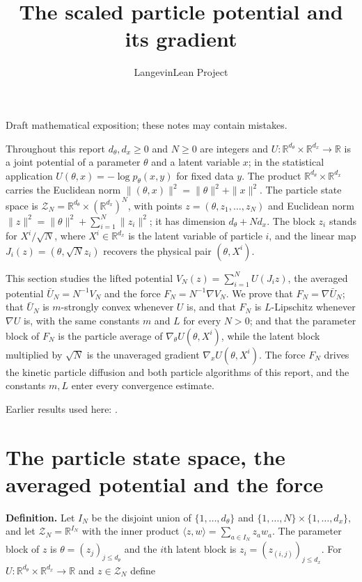 \documentclass[11pt,a4paper]{article}
\title{\texorpdfstring{The scaled particle potential and its gradient}{The scaled particle potential and its gradient}}
\author{LangevinLean Project}
\date{}
\begin{document}
\maketitle
Draft mathematical exposition; these notes may contain mistakes.


Throughout this report \(d_\theta,d_x\ge0\) and \(N\ge0\) are integers and \(U:\mathbb R^{d_\theta}\times\mathbb R^{d_x}\to\mathbb R\) is a joint potential of a parameter \(\theta\) and a latent variable \(x\); in the statistical application \(U(\theta,x)=-\log p_\theta(x,y)\) for fixed data \(y\). The product \(\mathbb R^{d_\theta}\times\mathbb R^{d_x}\) carries the Euclidean norm \(\|(\theta,x)\|^2=\|\theta\|^2+\|x\|^2\). The particle state space is \(\mathcal Z_N=\mathbb R^{d_\theta}\times(\mathbb R^{d_x})^N\), with points \(z=(\theta,z_1,\dots,z_N)\) and Euclidean norm \(\|z\|^2=\|\theta\|^2+\sum_{i=1}^N\|z_i\|^2\); it has dimension \(d_\theta+Nd_x\). The block \(z_i\) stands for \(X^i/\sqrt N\), where \(X^i\in\mathbb R^{d_x}\) is the latent variable of particle \(i\), and the linear map \(J_i(z)=(\theta,\sqrt Nz_i)\) recovers the physical pair \((\theta,X^i)\).




This section studies the lifted potential \(V_N(z)=\sum_{i=1}^NU(J_iz)\), the averaged potential \(\bar U_N=N^{-1}V_N\) and the force \(F_N=N^{-1}\nabla V_N\). We prove that \(F_N=\nabla\bar U_N\); that \(\bar U_N\) is \(m\)-strongly convex whenever \(U\) is, and that \(F_N\) is \(L\)-Lipschitz whenever \(\nabla U\) is, with the same constants \(m\) and \(L\) for every \(N>0\); and that the parameter block of \(F_N\) is the particle average of \(\nabla_\theta U(\theta,X^i)\), while the latent block multiplied by \(\sqrt N\) is the unaveraged gradient \(\nabla_xU(\theta,X^i)\). The force \(F_N\) drives the kinetic particle diffusion and both particle algorithms of this report, and the constants \(m,L\) enter every convergence estimate.



Earlier results used here: \cite[Section~3.1]{LangevinLean2026IPLA}.

\section{\texorpdfstring{The particle state space, the averaged potential and the force}{The particle state space, the averaged potential and the force}}


\textbf{Definition.} Let \(I_N\) be the disjoint union of \(\{1,\dots,d_\theta\}\) and \(\{1,\dots,N\}\times\{1,\dots,d_x\}\), and let \(\mathcal Z_N=\mathbb R^{I_N}\) with the inner product \(\langle z,w\rangle=\sum_{a\in I_N}z_aw_a\). The parameter block of \(z\) is \(\theta=(z_j)_{j\le d_\theta}\) and the \(i\)th latent block is \(z_i=(z_{(i,j)})_{j\le d_x}\). For \(U:\mathbb R^{d_\theta}\times\mathbb R^{d_x}\to\mathbb R\) and \(z\in\mathcal Z_N\) define
\end{document}
